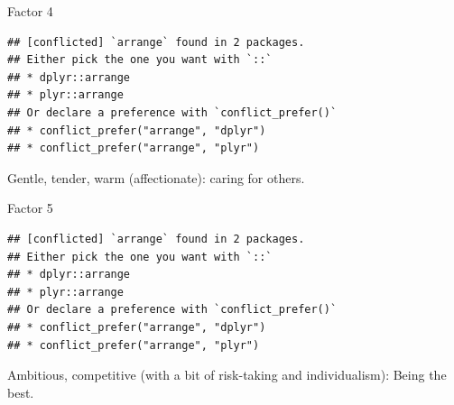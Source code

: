 \documentclass[ignorenonframetext,]{beamer}
\newenvironment{Shaded}{\begin{snugshade}}{\end{snugshade}}
\newcommand{\DecValTok}[1]{\textcolor[rgb]{0.00,0.00,0.81}{#1}}
\newcommand{\KeywordTok}[1]{\textcolor[rgb]{0.13,0.29,0.53}{\textbf{#1}}}
\newcommand{\NormalTok}[1]{#1}
\newcommand{\OperatorTok}[1]{\textcolor[rgb]{0.81,0.36,0.00}{\textbf{#1}}}
\newcommand{\StringTok}[1]{\textcolor[rgb]{0.31,0.60,0.02}{#1}}
\begin{document}
\begin{frame}[fragile]{Factor 4}
\protect\hypertarget{factor-4}{}

\begin{Shaded}
\end{Shaded}

\begin{verbatim}
## [conflicted] `arrange` found in 2 packages.
## Either pick the one you want with `::` 
## * dplyr::arrange
## * plyr::arrange
## Or declare a preference with `conflict_prefer()`
## * conflict_prefer("arrange", "dplyr")
## * conflict_prefer("arrange", "plyr")
\end{verbatim}

Gentle, tender, warm (affectionate): caring for others.

\end{frame}

\begin{frame}[fragile]{Factor 5}
\protect\hypertarget{factor-5}{}

\begin{Shaded}
\end{Shaded}

\begin{verbatim}
## [conflicted] `arrange` found in 2 packages.
## Either pick the one you want with `::` 
## * dplyr::arrange
## * plyr::arrange
## Or declare a preference with `conflict_prefer()`
## * conflict_prefer("arrange", "dplyr")
## * conflict_prefer("arrange", "plyr")
\end{verbatim}

Ambitious, competitive (with a bit of risk-taking and individualism):
Being the best.

\end{frame}
\end{document}
